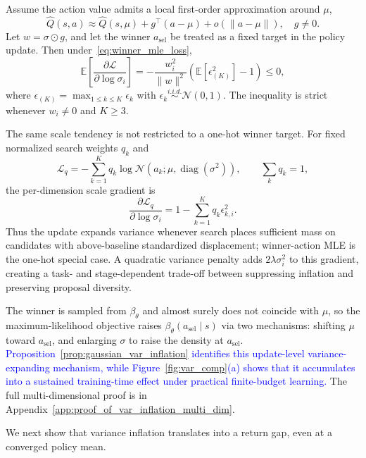 \begin{proposition}
\label{prop:gaussian_var_inflation}
Assume the action value admits a local first-order approximation around $\mu$,
\[
\hat Q(s,a)\approx \hat Q(s,\mu)+g^\top(a-\mu)+o(\|a-\mu\|),\quad g\neq 0.
\]
Let $w=\sigma\odot g$, and let the winner $a_{\mathrm{sel}}$ be treated as a fixed target in the policy update. Then under~\eqref{eq:winner_mle_loss},
\[
\mathbb{E}\!\left[\frac{\partial \mathcal L}{\partial \log\sigma_i}\right]
=
-\frac{w_i^2}{\|w\|^2}\!\left(\mathbb{E}[\epsilon_{(K)}^2]-1\right)
\le 0,
\]
where $\epsilon_{(K)}=\max_{1\le k\le K}\epsilon_k$ with $\epsilon_k\overset{i.i.d.}{\sim}\mathcal{N}(0,1)$. The inequality is strict whenever $w_i\neq 0$ and $K\ge 3$.
\end{proposition}

{\color{blue}\begin{remark}
The same scale tendency is not restricted to a one-hot winner target. For fixed normalized search weights $q_k$ and
\[
\mathcal L_q=-\sum_{k=1}^{K}q_k\log\mathcal N
\!\left(a_k;\mu,\operatorname{diag}(\sigma^2)\right),
\qquad \sum_k q_k=1,
\]
the per-dimension scale gradient is
\[
\frac{\partial\mathcal L_q}{\partial\log\sigma_i}
=1-\sum_{k=1}^{K}q_k\epsilon_{k,i}^{2}.
\]
Thus the update expands variance whenever search places sufficient mass on candidates with above-baseline standardized displacement; winner-action MLE is the one-hot special case. A quadratic variance penalty adds $2\lambda\sigma_i^2$ to this gradient, creating a task- and stage-dependent trade-off between suppressing inflation and preserving proposal diversity.
\end{remark}}

The winner is sampled from $\beta_\theta$ and almost surely does not coincide with $\mu$, so the maximum-likelihood objective raises $\beta_\theta(a_{\mathrm{sel}}\mid s)$ via two mechanisms: shifting $\mu$ toward $a_{\mathrm{sel}}$, and enlarging $\sigma$ to raise the density at $a_{\mathrm{sel}}$. \textcolor{blue}{Proposition~\ref{prop:gaussian_var_inflation} identifies this update-level variance-expanding mechanism, while Figure~\ref{fig:var_comp}(a) shows that it accumulates into a sustained training-time effect under practical finite-budget learning.} The full multi-dimensional proof is in Appendix~\ref{app:proof_of_var_inflation_multi_dim}.

We next show that variance inflation translates into a return gap, even at a converged policy mean.

